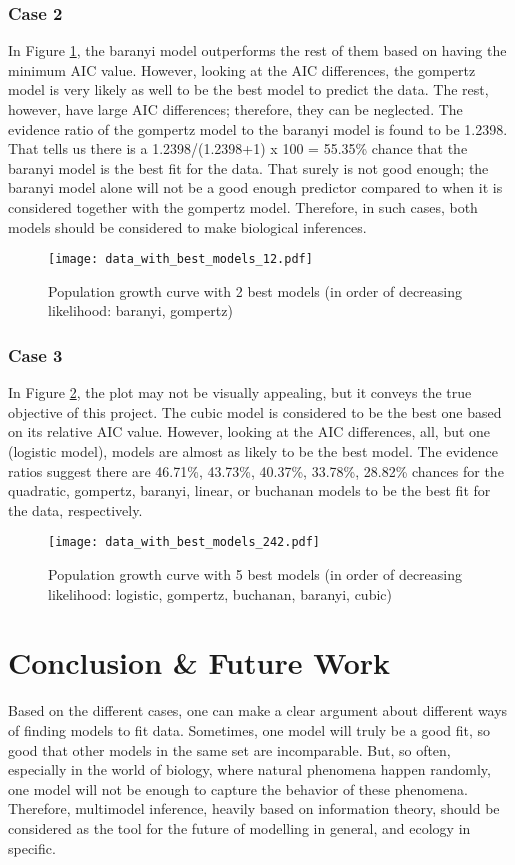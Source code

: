 \documentclass[11pt]{article}
\begin{document}
\begin{linenumbers}
	\subsubsection{Case 2}
	In Figure \ref{tab:figure_12}, the baranyi model outperforms the rest of them based on having the minimum AIC value. However, looking at the AIC differences, the gompertz model is very likely as well to be the best model to predict the data. The rest, however, have large AIC differences; therefore, they can be neglected. The evidence ratio of the gompertz model to the baranyi model is found to be 1.2398. That tells us there is a 1.2398/(1.2398+1) x 100 = 55.35\% chance that the baranyi model is the best fit for the data. That surely is not good enough; the baranyi model alone will not be a good enough predictor compared to when it is considered together with the gompertz model. Therefore, in such cases, both models should be considered to make biological inferences.
	
	\begin{figure}
		\centering
		\texttt{[image: data\_with\_best\_models\_12.pdf]}
		\caption{Population growth curve with 2 best models (in order of decreasing likelihood: baranyi, gompertz)}
		\label{tab:figure_12}
	\end{figure}

	\subsubsection{Case 3}
	In Figure \ref{tab:figure_242}, the plot may not be visually appealing, but it conveys the true objective of this project. The cubic model is considered to be the best one based on its relative AIC value. However, looking at the AIC differences, all, but one (logistic model), models are almost as likely to be the best model. The evidence ratios suggest there are 46.71\%, 43.73\%, 40.37\%, 33.78\%, 28.82\% chances for the quadratic, gompertz, baranyi, linear, or buchanan models to be the best fit for the data, respectively.

	\begin{figure}
		\centering
		\texttt{[image: data\_with\_best\_models\_242.pdf]}
		\caption{Population growth curve with 5 best models (in order of decreasing likelihood: logistic, gompertz, buchanan, baranyi, cubic)}
		\label{tab:figure_242}
	\end{figure}

	\section{Conclusion \& Future Work}
	Based on the different cases, one can make a clear argument about different ways of finding models to fit data. Sometimes, one model will truly be a good fit, so good that other models in the same set are incomparable. But, so often, especially in the world of biology, where natural phenomena happen randomly, one model will not be enough to capture the behavior of these phenomena. Therefore, multimodel inference, heavily based on information theory, should be considered as the tool for the future of modelling in general, and ecology in specific.
	

\end{linenumbers}
\end{document}
